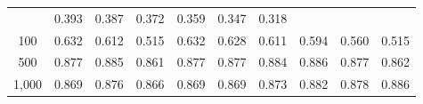 \documentclass{article}
\numberwithin{equation}{section}
\begin{document}
\begin{table}[ht]
\begin{tabular}{c|ccc|cccccc}
& 0.393 & 0.387 & 0.372 & 0.359 & 0.347 & 0.318 \\
100
& 0.632 & 0.612 & 0.515
& 0.632 & 0.628 & 0.611 & 0.594 & 0.560 & 0.515 \\
500
& \cellcolor{covheat!88!white}0.877 & \cellcolor{covheat!92!white}0.885 & \cellcolor{covheat!80!white}0.861
& \cellcolor{covheat!88!white}0.877 & \cellcolor{covheat!88!white}0.877 & \cellcolor{covheat!92!white}0.884 & \cellcolor{covheat!93!white}0.886 & \cellcolor{covheat!88!white}0.877 & \cellcolor{covheat!81!white}0.862 \\
1{,}000
& \cellcolor{covheat!84!white}0.869 & \cellcolor{covheat!88!white}0.876 & \cellcolor{covheat!83!white}0.866
& \cellcolor{covheat!84!white}0.869 & \cellcolor{covheat!84!white}0.869 & \cellcolor{covheat!86!white}0.873 & \cellcolor{covheat!91!white}0.882 & \cellcolor{covheat!89!white}0.878 & \cellcolor{covheat!93!white}0.886 \\
\hline
\end{tabular}
\end{table}
\end{document}
